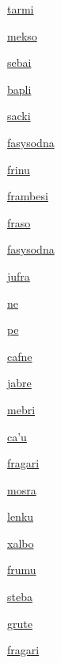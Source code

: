 {\hyperlink{val:tarmi}{tarmi}}{}{}{}

{\hyperlink{val:mekso}{mekso}}{}{}{}

{\hyperlink{val:sebai}{sebai}}{}{}{}

{\hyperlink{val:bapli}{bapli}}{}{}{}

{\hyperlink{val:sacki}{sacki}}{}{}{}

{\hyperlink{val:fasysodna}{fasysodna}}{}{}{}

{\hyperlink{val:frinu}{frinu}}{}{}{}

{\hyperlink{val:frambesi}{frambesi}}{}{}{}

{\hyperlink{val:fraso}{fraso}}{}{}{}

{\hyperlink{val:fasysodna}{fasysodna}}{}{}{}

{\hyperlink{val:jufra}{jufra}}{}{}{}

{\hyperlink{val:ne}{ne}}{}{}{}

{\hyperlink{val:pe}{pe}}{}{}{}

{\hyperlink{val:cafne}{cafne}}{}{}{}

{\hyperlink{val:jabre}{jabre}}{}{}{}

{\hyperlink{val:mebri}{mebri}}{}{}{}

{\hyperlink{val:cahu}{ca'u}}{}{}{}

{\hyperlink{val:fragari}{fragari}}{}{}{}

{\hyperlink{val:mosra}{mosra}}{}{}{}

{\hyperlink{val:lenku}{lenku}}{}{}{}

{\hyperlink{val:xalbo}{xalbo}}{}{}{}

{\hyperlink{val:frumu}{frumu}}{}{}{}

{\hyperlink{val:steba}{steba}}{}{}{}

{\hyperlink{val:grute}{grute}}{}{}{}

{\hyperlink{val:fragari}{fragari}}{}{}{}

